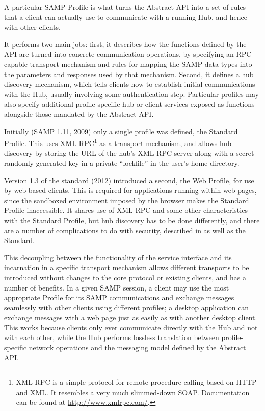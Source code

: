 \documentclass[5p]{elsarticle}
\begin{document}
A particular SAMP Profile is what
turns the Abstract API into a set of rules
that a client can actually use to communicate with a running Hub,
and hence with other clients.

It performs two main jobs: first, it describes
how the functions defined by the API are turned into concrete
communication operations, by specifying an RPC-capable
transport mechanism and rules for mapping the SAMP
data types into the parameters and responses used by that mechanism.
Second, it defines a hub discovery mechanism,
which tells clients how to establish initial communications with the Hub,
usually involving some authentication step.
Particular profiles may also specify additional
profile-specific hub or client services exposed as functions
alongside those mandated by the Abstract API.

Initially (SAMP 1.11, 2009)
only a single profile was defined, the Standard Profile.
This uses XML-RPC\footnote{
   XML-RPC is a simple protocol for remote procedure calling
   based on HTTP and XML. It resembles a very much slimmed-down SOAP.
   Documentation can be found at \url{http://www.xmlrpc.com/}.
}
as a transport mechanism,
and allows hub discovery by storing the URL of the hub's XML-RPC server
along with a secret randomly generated key in a private ``lockfile''
in the user's home directory.

Version 1.3 of the standard (2012) introduced a second, the Web Profile,
for use by web-based clients.
This is required for applications running within web pages,
since the sandboxed environment imposed by the browser
makes the Standard Profile inaccessible.
It shares use of XML-RPC and some other characteristics with the
Standard Profile, but hub discovery has to be done differently,
and there are a number of complications to do with security,
described in \citet{adassxxi_paper} as well as the Standard.

This decoupling between the functionality of the service interface
and its incarnation in a specific transport mechanism
allows different transports to be introduced without changes to the core
protocol or existing clients, and has a number of benefits.
In a given SAMP session, a client may use the most appropriate
Profile for its SAMP communications and exchange
messages seamlessly with other clients using different profiles;
a desktop application can exchange messages with a web page
just as easily as with another desktop client.
This works because clients only ever
communicate directly with the Hub and not with each other,
while the Hub performs lossless translation between
profile-specific network operations
and the messaging model defined by the Abstract API.
\end{document}
